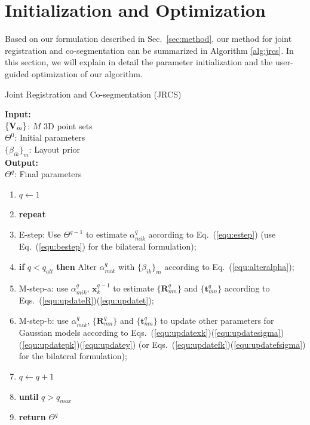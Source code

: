 \section{Initialization and Optimization}
\label{sec:imp}
Based on our formulation described in Sec.~\ref{sec:method}, our method for joint registration and co-segmentation can be summarized in Algorithm \ref{alg:jrcs}.
%
In this section, we will explain in detail the parameter initialization and the user-guided optimization of our algorithm.

\begin{algorithm}[htb]
	\caption{Joint Registration and Co-segmentation (JRCS)}
	\label{alg:jrcs}
	\textbf{Input:}~~\\  
	$\{\mathbf{V}_m\}$: $M$ 3D point sets\\
	$\Theta^0$: Initial parameters\\
	$\{\beta_{ik}\}_{m}$: Layout prior\\
	\textbf{Output:}~~\\
	$\Theta^q$: Final parameters~~
	\begin{enumerate}
		\item $q\leftarrow1$
		\item \textbf{repeat}
		\item E-step: Use $\Theta^{q-1}$ to estimate $\alpha_{mik}^q$ according to Eq.~(\ref{equ:estep}) (use Eq.~(\ref{equ:bestep}) for the bilateral formulation);
		\item \textbf{if} $q < q_{alt}$  \textbf{then} Alter $\alpha_{mik}^q$ with $\{\beta_{ik}\}_{m}$ according to Eq.~(\ref{equ:alteralpha});
		\item M-step-a: use $\alpha^q_{mik}$, $\mathbf x^{q-1}_k$ to estimate $\{\mathbf{R}_{mn}^q\}$ and $\{\mathbf t_{mn}^q\}$ according to Eqs.~(\ref{equ:updateR})(\ref{equ:updatet});
		\item M-step-b: use $\alpha^q_{mik}$, $\{\mathbf{R}_{mn}^q\}$ and $\{\mathbf{t}_{mn}^q\}$ to update other parameters for Gaussian models according to Eqs.~(\ref{equ:updatexk})(\ref{equ:updatesigma})(\ref{equ:updatepk})(\ref{equ:updatey})  (or Eqs.~(\ref{equ:updatefk})(\ref{equ:updatefsigma}) for the bilateral formulation);
		\item $q \leftarrow q+1$
		\item \textbf{until} $q > q_{max}$
		\item \textbf{return} $\Theta^q$
	\end{enumerate}
\end{algorithm}




